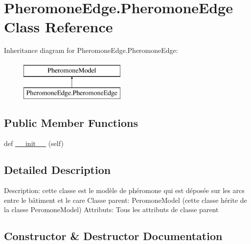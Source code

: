 \hypertarget{class_pheromone_edge_1_1_pheromone_edge}{}\section{Pheromone\+Edge.\+Pheromone\+Edge Class Reference}
\label{class_pheromone_edge_1_1_pheromone_edge}
Inheritance diagram for Pheromone\+Edge.\+Pheromone\+Edge\+:\begin{figure}[H]
\begin{center}
\leavevmode
\includegraphics[height=2.000000cm]{class_pheromone_edge_1_1_pheromone_edge}
\end{center}
\end{figure}
\subsection*{Public Member Functions}
\begin{DoxyCompactItemize}
\item 
def \mbox{\hyperlink{class_pheromone_edge_1_1_pheromone_edge_add7daf216e9ce9c5ac6b5991036fe615}{\+\_\+\+\_\+init\+\_\+\+\_\+}} (self)
\end{DoxyCompactItemize}


\subsection{Detailed Description}
\begin{DoxyVerb}Description: cette classe est le modèle de phéromone qui est déposée sur les arcs entre le bâtiment et le care
Classe parent: PeromoneModel (cette classe hérite de la classe PeromoneModel)
Attributs:
    Tous les attributs de classe parent
\end{DoxyVerb}
 

\subsection{Constructor \& Destructor Documentation}
\mbox{\label{class_pheromone_edge_1_1_pheromone_edge_add7daf216e9ce9c5ac6b5991036fe615}} 
